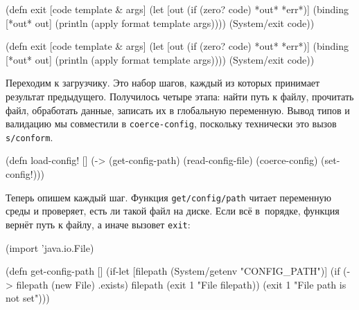 \ifnarrow

\begin{english}
  \begin{clojure}
(defn exit
  [code template & args]
  (let [out (if (zero? code)
              *out*
              *err*)]
    (binding [*out* out]
      (println (apply format
        template args))))
  (System/exit code))
  \end{clojure}
\end{english}

\else

\begin{english}
  \begin{clojure}
(defn exit
  [code template & args]
  (let [out (if (zero? code) *out* *err*)]
    (binding [*out* out]
      (println (apply format template args))))
  (System/exit code))
  \end{clojure}
\end{english}

\fi

Переходим к загрузчику. Это набор шагов, каждый из которых принимает результат
предыдущего. Получилось четыре этапа: найти путь к файлу, прочитать файл,
обработать данные, записать их в глобальную переменную. Вывод типов и валидацию
мы совместили в \verb|coerce-config|, поскольку технически это вызов
\verb|s/conform|.


\begin{english}
  \begin{clojure}
(defn load-config! []
  (-> (get-config-path)
      (read-config-file)
      (coerce-config)
      (set-config!)))
  \end{clojure}
\end{english}

Теперь опишем каждый шаг. Функция \texttt{get\-/config\-/path} читает переменную
среды и проверяет, есть ли такой файл на диске. Если всё в~порядке, функция
вернёт путь к файлу, а иначе вызовет \verb|exit|:


\ifnarrow

\begin{english}
  \begin{clojure}
(import 'java.io.File)

(defn get-config-path []
  (if-let [filepath (System/getenv
                      "CONFIG_PATH")]
    (if (-> filepath (new File) .exists)
      filepath
      (exit 1 "File %
        filepath))
    (exit 1 "File path is not set")))
  \end{clojure}
\end{english}

